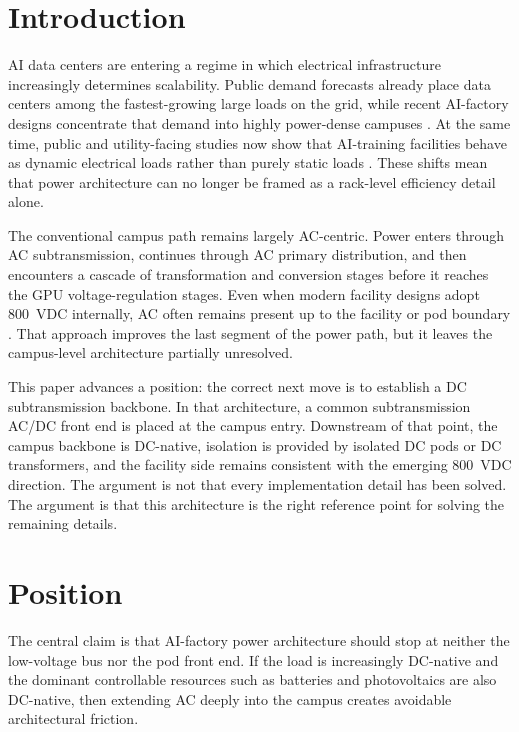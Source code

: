 \documentclass[11pt]{article}
\begin{document}
\section{Introduction}
AI data centers are entering a regime in which electrical infrastructure increasingly determines scalability. Public demand forecasts already place data centers among the fastest-growing large loads on the grid, while recent AI-factory designs concentrate that demand into highly power-dense campuses \cite{IEA2025EnergyAI,LBL2025DataCenterDemand,NVIDIA2025SuperPOD}. At the same time, public and utility-facing studies now show that AI-training facilities behave as dynamic electrical loads rather than purely static loads \cite{PNNL2026EMT,Choukse2025PowerStabilization,Mishra2025Oscillation}. These shifts mean that power architecture can no longer be framed as a rack-level efficiency detail alone.

The conventional campus path remains largely AC-centric. Power enters through AC subtransmission, continues through AC primary distribution, and then encounters a cascade of transformation and conversion stages before it reaches the GPU voltage-regulation stages. Even when modern facility designs adopt 800~VDC internally, AC often remains present up to the facility or pod boundary \cite{NVIDIA2025HVDCBlog}. That approach improves the last segment of the power path, but it leaves the campus-level architecture partially unresolved.

This paper advances a position: the correct next move is to establish a DC subtransmission backbone. In that architecture, a common subtransmission AC/DC front end is placed at the campus entry. Downstream of that point, the campus backbone is DC-native, isolation is provided by isolated DC pods or DC transformers, and the facility side remains consistent with the emerging 800~VDC direction. The argument is not that every implementation detail has been solved. The argument is that this architecture is the right reference point for solving the remaining details.

\section{Position}
The central claim is that AI-factory power architecture should stop at neither the low-voltage bus nor the pod front end. If the load is increasingly DC-native and the dominant controllable resources such as batteries and photovoltaics are also DC-native, then extending AC deeply into the campus creates avoidable architectural friction.
\end{document}
